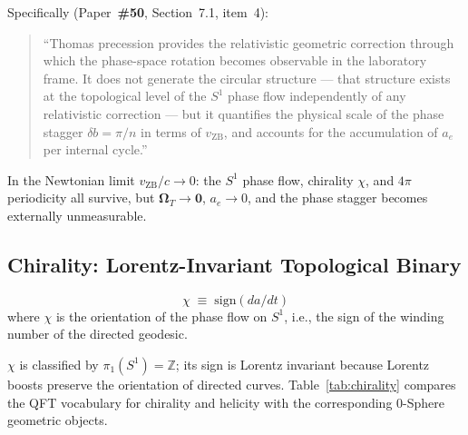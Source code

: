 \documentclass[12pt,letterpaper]{article}
\newcommand{\paperno}[1]{\textbf{\#{}#1}}
\newcommand{\OmT}{\boldsymbol{\Omega}_T}
\newcommand{\vZB}{v_{\mathrm{ZB}}}
\begin{document}
\noindent Specifically (Paper~\paperno{50}, Section~7.1, item~4):
\begin{quotation}\noindent
``Thomas precession provides the relativistic geometric correction through which the
phase-space rotation becomes observable in the laboratory frame.
It does not generate the circular structure --- that structure exists at the topological
level of the $S^1$ phase flow independently of any relativistic correction ---
but it quantifies the physical scale of the phase stagger $\delta b = \pi/n$
in terms of $\vZB$, and accounts for the accumulation of $a_e$ per internal cycle.''
\end{quotation}

\noindent In the Newtonian limit $\vZB/c\to 0$:
the $S^1$ phase flow, chirality $\chi$, and $4\pi$ periodicity all survive,
but $\OmT\to\mathbf{0}$, $a_e\to 0$,
and the phase stagger becomes externally unmeasurable.

\subsection{Chirality: Lorentz-Invariant Topological Binary}

\begin{equation}
\boxed{\chi \;\equiv\; \mathrm{sign}(da/dt)}
\end{equation}
where $\chi$ is the orientation of the phase flow on $S^1$, i.e., the sign of the winding number of the directed geodesic.

$\chi$ is classified by $\pi_1(S^1) = \mathbb{Z}$; its sign is Lorentz invariant
because Lorentz boosts preserve the orientation of directed curves.
Table~\ref{tab:chirality} compares the QFT vocabulary for chirality and helicity with the corresponding 0-Sphere geometric objects.
\end{document}
